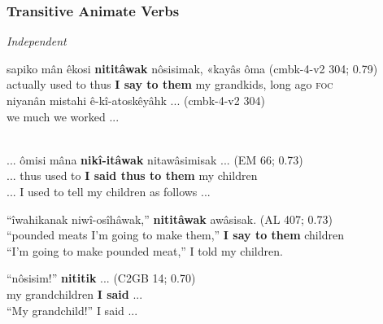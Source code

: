 \subsubsection{Transitive Animate Verbs}
\textit{Independent}

    \begin{exe}
    \ex 
    \gll sapiko mân êkosi \textbf{nititâwak} nôsisimak, «kayâs ôma \tiny{(cmbk-4-v2 304; 0.79)}\\
    actually {used to} thus {\textbf{I say to them}} {my grandkids}, {long ago} \textsc{foc} \\
    \gll niyanân mistahi ê-kî-atoskêyâhk ... \tiny{(cmbk-4-v2 304)} \\
    we much {we worked} ... \\
    \trans \\
    \label{vta-ivc1}
    \end{exe}
    
    \begin{exe}
    \ex 
    \gll ... ômisi mâna \textbf{nikî-itâwak} nitawâsimisak ... \tiny{(EM 66; 0.73)}\\
         ... thus {used to} {\textbf{I said thus to them}} {my children} \\
    \trans     ... I used to tell my children as follows ... \tiny{\citep[36]{Minde1997kwayask}} \\
    \label{vta-ivc2}
    \end{exe}
    
    \begin{exe}
    \ex 
    \gll ``îwahikanak niwî-osîhâwak,'' \textbf{nititâwak} awâsisak. \tiny{(AL 407; 0.73)} \\
         ``{pounded meats} {I'm going to make them},'' {\textbf{I say to them}} {children} \\
    \trans ``I'm going to make pounded meat,'' I told my children. \tiny{\citep[206-207]{Bearetal1992}} \\
    \label{vta-ivc3}
    \end{exe}
    
    \begin{exe}
    \ex 
    \gll ``nôsisim!'' \textbf{nititik} ... \tiny{(C2GB 14; 0.70)} \\
         {my grandchildren} {\textbf{I said}} ... \\
    \trans ``My grandchild!'' I said ... \tiny{\citep[68-69]{Bearetal1992}} \\
    \label{vta-ivc4}
    \end{exe}
    
